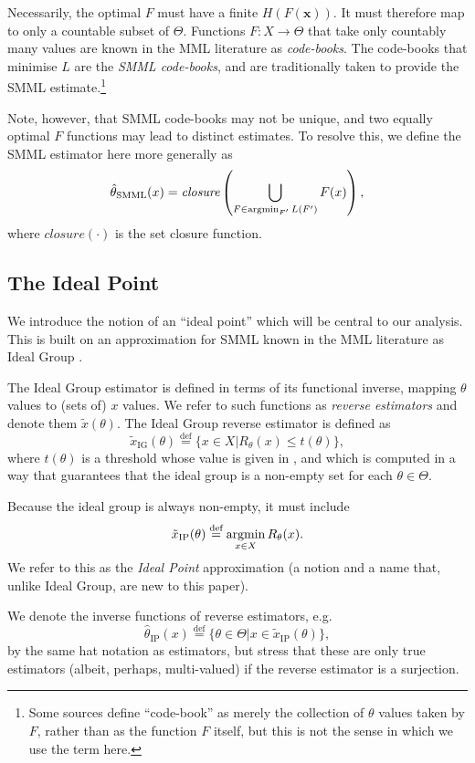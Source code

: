 \documentclass{IEEEtran}
\newcommand{\citet}[1]{\cite{#1}}
\newcommand{\citep}[1]{\cite{#1}}
\newcommand{\argmin}{\operatornamewithlimits{argmin}}
\newcommand{\defeq}{\stackrel{\text{def}}{=}}
\begin{document}
Necessarily, the optimal $F$ must have a finite $H(F(\mathbf{x}))$. It
must therefore map to only a countable subset of $\Theta$.
Functions $F:X\to\Theta$ that take only countably many values are known in the
MML literature as \emph{code-books}. The code-books that minimise $L$ are the
\emph{SMML code-books}, and are traditionally taken to provide the SMML
estimate.\footnote{Some sources define ``code-book'' as merely the collection
of $\theta$ values taken by $F$, rather than as the function $F$ itself, but
this is not the sense in which we use the term here.}

Note, however, that SMML code-books may not be unique, and two equally optimal
$F$ functions may lead to distinct estimates. To resolve this, we define the
SMML estimator here more generally as
\[
\hat{\theta}_\text{SMML}(x)=\textit{closure}\left(\bigcup_{F\in\argmin_{F'} L(F')} F(x)\right),
\]
where $\textit{closure}(\cdot)$ is the set closure function.

\subsection{The Ideal Point}\label{SS:ip}

We introduce the notion of an ``ideal point'' which will be central to our
analysis. This is built on an approximation for SMML known in the MML
literature as Ideal Group \citep{Wallace2005}.

The Ideal Group estimator is defined in terms of its functional inverse,
mapping $\theta$ values to (sets of) $x$ values. We refer to such functions
as \emph{reverse estimators} and denote them $\tilde{x}(\theta)$.
The Ideal Group reverse estimator is defined as
\begin{equation}\label{Eq:IG}
\tilde{x}_{\text{IG}}(\theta)\defeq \{x\in X|R_{\theta}(x)\le t(\theta)\},
\end{equation}
where $t(\theta)$ is a threshold whose value is given in \citet{Wallace2005},
and which is computed in a way that guarantees that
the ideal group is a non-empty set for each $\theta\in\Theta$.

Because the ideal group is always non-empty, it must include
\[
\tilde{x}_{\text{IP}}(\theta)\defeq\argmin_{x\in X} R_{\theta}(x).
\]
We refer to this as the \emph{Ideal Point} approximation (a notion and a name
that, unlike Ideal Group, are new to this paper).

We denote the inverse functions of reverse estimators, e.g.
\[
\hat{\theta}_{\text{IP}}(x)\defeq\{\theta\in\Theta|x\in\tilde{x}_{\text{IP}}(\theta)\},
\]
by the same hat notation as estimators,
but stress that these are only true estimators (albeit, perhaps, multi-valued)
if the reverse estimator is a surjection.
\end{document}
